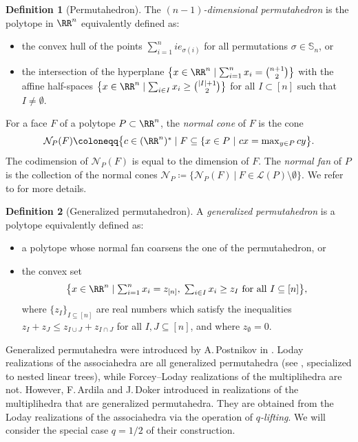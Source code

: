 \documentclass[JEP,XML,SOM,NoFloatCountersInSection,Unicode,published]{cedram}
\theoremstyle{definition}
\newtheorem{definition}{Definition}[section]
\theoremstyle{plain}
\begin{document}
\label{sec:generalizedpermutahedra}

\begin{definition}[Permutahedron] The \emph{$(n-1)$-dimensional permutahedron} is the polytope in $\RR^n$ equivalently defined as:
\begin{itemize}
\item the convex hull of the points $\sum_{i=1}^{n}i e_{\sigma(i)}$ for all permutations $\sigma \in \mathbb{S}_n$, or
\item the intersection of the hyperplane $\bigl\{x \in \RR^n \mid \sum_{i=1}^{n} x_i = \binom{n+1}{2}\bigr\}$ with the affine half-spaces $\bigl\{x \in \RR^n \mid \sum_{i \in I} x_i \geq \binom{|I|+1}{2}\bigr\}$ for all $I \subset [n]$ such that $I \neq \emptyset$.
\end{itemize}
\end{definition}

For a face $F$ of a polytope $P\subset\RR^n$, the \emph{normal cone} of $F$ is the cone
\[
\textstyle\mathcal{N}_P(F)\coloneqq \bigl\{ c \in (\RR^n)^{*} \mid F \subseteq \{ x \in P \ | \ c x =\max_{y \in P} c y\bigr\}.
\]
The codimension of $\mathcal{N}_P(F)$ is equal to the dimension of $F$.
The \emph{normal fan} of $P$ is the collection of the normal cones $\mathcal{N}_P \coloneqq \{\mathcal{N}_P(F) \ | \ F \in \mathcal{L}(P)\setminus\emptyset \}$.
We refer to \cite[Chap.\,7]{Ziegler95} for more details.

\begin{definition}[Generalized permutahedron]
A \emph{generalized permutahedron} is a polytope equivalently defined as:
\begin{itemize}
\item a polytope whose normal fan coarsens the one of the permutahedron, or
\item the convex set
\[
\textstyle
\bigl\{ x \in \RR^n \mid \sum_{i=1}^{n}x_i = z_{[n]},\; \sum_{i \in I} x_i \geq z_I \text{ for all } I \subseteq [n] \bigr\},
\]
where $\{ z_I \}_{I \subseteq [n]}$ are real numbers which satisfy the inequalities $z_I+z_J \leq z_{I\cup J} + z_{I \cap J}$ for all $I,J \subseteq [n]$, and where $z_\emptyset =0$.
\end{itemize}
\end{definition}

Generalized permutahedra were introduced by A.\,Postnikov in \cite{Postnikov09}.
Loday realizations of the associahedra are all generalized permutahedra (see \cite[Cor.\,2.16(2)]{LA21}, specialized to nested linear trees), while Forcey--Loday realizations of the multiplihedra are not.
However, F.\,Ardila and J.\,Doker introduced in \cite{AD13} realizations of the multiplihedra that are generalized permutahedra.
They are obtained from the Loday realizations of the associahedra via the operation of \emph{$q$-lifting}.
We will consider the special case $q=1/2$ of their construction.
\end{document}
